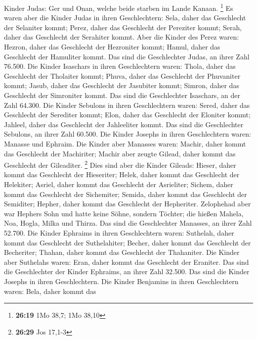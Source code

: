 Kinder Judas: Ger und Onan, welche beide starben im Lande Kanaan.
\footnote{\textbf{26:19} 1Mo 38,7; 1Mo 38,10}  Es waren
aber die Kinder Judas in ihren Geschlechtern: Sela, daher das Geschlecht
der Selaniter kommt; Perez, daher das Geschlecht der Pereziter kommt;
Serah, daher das Geschlecht der Serahiter kommt.  Aber
die Kinder des Perez waren: Hezron, daher das Geschlecht der Hezroniter
kommt; Hamul, daher das Geschlecht der Hamuliter kommt. 
Das sind die Geschlechter Judas, an ihrer Zahl 76.500. 
Die Kinder Isaschars in ihren Geschlechtern waren: Thola, daher das
Geschlecht der Tholaiter kommt; Phuva, daher das Geschlecht der
Phuvaniter kommt;  Jasub, daher das Geschlecht der
Jasubiter kommt; Simron, daher das Geschlecht der Simroniter kommt.
 Das sind die Geschlechter Isaschars, an der Zahl 64.300.
 Die Kinder Sebulons in ihren Geschlechtern waren: Sered,
daher das Geschlecht der Serediter kommt; Elon, daher das Geschlecht der
Eloniter kommt; Jahleel, daher das Geschlecht der Jahleeliter kommt.
 Das sind die Geschlechter Sebulons, an ihrer Zahl
60.500.  Die Kinder Josephs in ihren Geschlechtern waren:
Manasse und Ephraim.  Die Kinder aber Manasses waren:
Machir, daher kommt das Geschlecht der Machiriter; Machir aber zeugte
Gilead, daher kommt das Geschlecht der Gileaditer. \footnote{\textbf{26:29}
  Jos 17,1-3}  Dies sind aber die Kinder Gileads: Hieser,
daher kommt das Geschlecht der Hieseriter; Helek, daher kommt das
Geschlecht der Helekiter;  Asriel, daher kommt das
Geschlecht der Asrieliter; Sichem, daher kommt das Geschlecht der
Sichemiter;  Semida, daher kommt das Geschlecht der
Semiditer; Hepher, daher kommt das Geschlecht der Hepheriter.
 Zelophehad aber war Hephers Sohn und hatte keine Söhne,
sondern Töchter; die hießen Mahela, Noa, Hogla, Milka und Thirza.
 Das sind die Geschlechter Manasses, an ihrer Zahl
52.700.  Die Kinder Ephraims in ihren Geschlechtern
waren: Suthelah, daher kommt das Geschlecht der Suthelahiter; Becher,
daher kommt das Geschlecht der Becheriter; Thahan, daher kommt das
Geschlecht der Thahaniter.  Die Kinder aber Suthelahs
waren: Eran, daher kommt das Geschlecht der Eraniter. 
Das sind die Geschlechter der Kinder Ephraims, an ihrer Zahl 32.500. Das
sind die Kinder Josephs in ihren Geschlechtern.  Die
Kinder Benjamins in ihren Geschlechtern waren: Bela, daher kommt das
